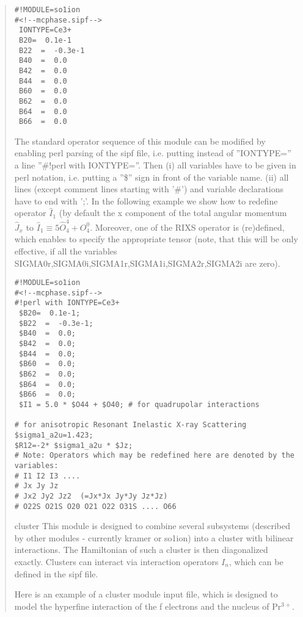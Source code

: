 \begin{quote}
\begin{verbatim}
#!MODULE=so1ion
#<!--mcphase.sipf-->
 IONTYPE=Ce3+
 B20=  0.1e-1                                           
 B22  =  -0.3e-1                                       
 B40  =  0.0
 B42  =  0.0
 B44  =  0.0
 B60  =  0.0
 B62  =  0.0
 B64  =  0.0
 B66  =  0.0
\end{verbatim}

The standard operator sequence of this module can be modified by enabling 
perl parsing
of the sipf file, i.e. putting instead of ''IONTYPE='' a line ''\#!perl with IONTYPE=''.
Then (i) all variables have to be given in perl notation, i.e. putting a ''\$'' sign
in front of the variable name. (ii) all lines (except comment lines starting with
'\#') and variable declarations have to end with ';'. In the following example
we show how to redefine operator $\hat I_1$ (by default the x component of the
total angular momentum $\hat J_x$ to $\hat I_1 \equiv 5 \hat O_4^4 + O_4^0$.
Moreover, one of the RIXS operator is (re)defined, which enables to specify 
the appropriate tensor (note, that this will be only effective, if all the variables
SIGMA0r,SIGMA0i,SIGMA1r,SIGMA1i,SIGMA2r,SIGMA2i are zero).

\begin{verbatim}
#!MODULE=so1ion
#<!--mcphase.sipf-->
#!perl with IONTYPE=Ce3+
 $B20=  0.1e-1;                                       
 $B22  =  -0.3e-1;
 $B40  =  0.0;
 $B42  =  0.0;
 $B44  =  0.0;
 $B60  =  0.0;
 $B62  =  0.0;
 $B64  =  0.0;
 $B66  =  0.0;
 $I1 = 5.0 * $O44 + $O40; # for quadrupolar interactions

# for anisotropic Resonant Inelastic X-ray Scattering
$sigma1_a2u=1.423;
$R12=-2* $sigma1_a2u * $Jz;
# Note: Operators which may be redefined here are denoted by the variables:
# I1 I2 I3 ....
# Jx Jy Jz
# Jx2 Jy2 Jz2  (=Jx*Jx Jy*Jy Jz*Jz)
# O22S O21S O20 O21 O22 O31S .... O66
\end{verbatim}

\item[{\prg cluster\index{cluster}}]
This module is designed to combine several subsystems (described
by other modules - currently kramer or so1ion) into a cluster with bilinear
interactions. The Hamiltonian of such a cluster is then
diagonalized exactly. Clusters can interact via interaction operators
$I_n$, which can be defined in the sipf file. 

Here is an example of a cluster module input file, which is designed
to model the hyperfine interaction of the f electrons and the nucleus
of Pr$^{3+}$.


\end{quote}
